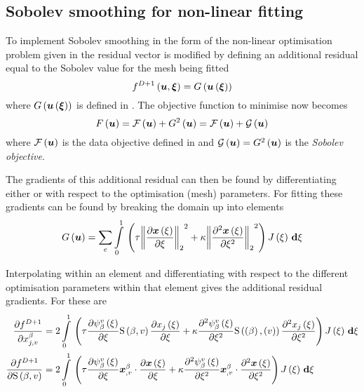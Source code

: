\subsection{Sobolev smoothing for non-linear fitting}

To implement Sobolev smoothing in the form of the non-linear optimisation problem
given in  the residual vector is modified by defining
an additional residual equal to the Sobolev value for the mesh being fitted \ie
\begin{equation}
  \fnof{f^{D+1}}{\vectr{u},\vectr{\xi}}=\fnof{G}{\fnof{\vectr{u}}{\vectr{\xi}}}
  \label{eqn:addSobresidual}
\end{equation}
where $ G\left(  \boldsymbol{u}\left( \boldsymbol{\xi} \right)  \right) $ is defined in
.  The objective function to minimise now becomes
\begin{equation}
   F\left( \boldsymbol{u} \right) = \mathcal{F}\left( \boldsymbol{u} \right) + G^{2}\left( \boldsymbol{u} \right) =
   \mathcal{F}\left( \boldsymbol{u} \right) + \mathcal{G}\left( \boldsymbol{u} \right) 
\end{equation}
where $ \mathcal{F}\left( \boldsymbol{u} \right) $ is the data objective defined in
 and
$ \mathcal{G}\left( \boldsymbol{u} \right) = G^{2}\left( \boldsymbol{u} \right) $ is the \emph{Sobolev
objective}.

The gradients of this additional residual can then be found by differentiating
either  or  with
respect to the optimisation (mesh) parameters. For \twodal fitting these
gradients can be found by breaking the domain up into elements \ie
\begin{equation}
   G\left( \boldsymbol{u} \right) = \displaystyle\sum _{e}  \displaystyle\int\limits_{0}^{1} \,\left( \tau {\ensuremath{\left\|  \dfrac{\partial 
           \boldsymbol{x}\left( \xi \right) }{\partial \xi}  \right\|}_{2}} ^{2}+\kappa {\ensuremath{\left\|  \dfrac{\partial^{2}  
            \boldsymbol{x}\left( \xi \right) }{\partial {\xi}^{2}}  \right\|}_{2}} ^{2} \right) J\left( \xi \right) \, \boldsymbol{\mathrm{d}} \xi 
\end{equation}

Interpolating within an element and differentiating with respect to the
different optimisation parameters within that element gives the additional
residual gradients. For \twods these are
\begin{align}
  \delby{f^{D+1}}{x^{\beta}_{j,v}}&=2\gint{0}{1}{\pbrac{\tau
      \delby{\gbfn{\beta}{v}{\xi}}{\xi}\gsf{\beta}{v}
      \delby{\fnof{x_{j}}{\xi}}{\xi}+\kappa\deltwosqby{\gbfn{\beta}{v}{\xi}}{\xi}
      \gsf{\pbrac{\beta}}{\pbrac{v}}
      \deltwosqby{\fnof{x_{j}}{\xi}}{\xi}}\fnof{J}{\xi}}{\xi} 
  \label{eqn:2Dsobjacnode} \\
  \delby{f^{D+1}}{\gsf{\beta}{v}}&=2\gint{0}{1}{\pbrac{\tau\delby{
        \gbfn{\beta}{v}{\xi}}{\xi}\dotprod{\vectr{x}^{\beta}_{,v}}{
        \delby{\fnof{\vectr{x}}{\xi}}{\xi}}+\kappa\deltwosqby{
        \gbfn{\beta}{v}{\xi}}{\xi}\dotprod{\vectr{x}^{\beta}_{,v}}{
        \deltwosqby{\fnof{\vectr{x}}{\xi}}{\xi}}}\fnof{J}{\xi}}{\xi}
  \label{eqn:2Dsobjacline}
\end{align}

